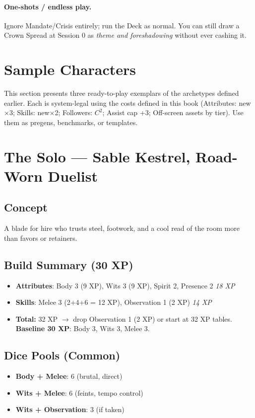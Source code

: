 \documentclass[12pt]{article}
\begin{document}
\paragraph{One-shots / endless play.} Ignore Mandate/Crisis entirely; run the Deck as normal. You can still draw a Crown Spread at Session 0 as \emph{theme and foreshadowing} without ever cashing it.


\appendix

\section{Sample Characters}

This section presents three ready-to-play exemplars of the archetypes defined earlier. Each is system-legal using the costs defined in this book (Attributes: new$\times$3; Skills: new$\times$2; Followers: $C^2$; Assist cap +3; Off-screen assets by tier). Use them as pregens, benchmarks, or templates.

\section{The Solo — Sable Kestrel, Road-Worn Duelist}

\subsection*{Concept}
A blade for hire who trusts steel, footwork, and a cool read of the room more than favors or retainers.

\subsection*{Build Summary (30 XP)}
\begin{itemize}
  \item \textbf{Attributes}: Body 3 (9 XP), Wits 3 (9 XP), Spirit 2, Presence 2 \hfill \emph{18 XP}
  \item \textbf{Skills}: Melee 3 (2+4+6 = 12 XP), Observation 1 (2 XP) \hfill \emph{14 XP}
  \item \textbf{Total:} 32 XP $\rightarrow$ drop Observation 1 (2 XP) or start at 32 XP tables. \textbf{Baseline 30 XP}: Body 3, Wits 3, Melee 3.
\end{itemize}

\subsection*{Dice Pools (Common)}
\begin{itemize}
  \item \textbf{Body + Melee}: 6 (brutal, direct)
  \item \textbf{Wits + Melee}: 6 (feints, tempo control)
  \item \textbf{Wits + Observation}: 3 (if taken)
\end{itemize}
\end{document}
